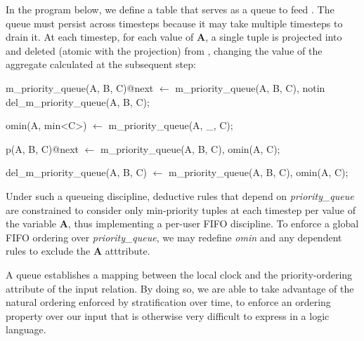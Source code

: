 In the program below, we define a table  that
serves as a queue to feed .  The queue must persist
across timesteps because it may take multiple timesteps to drain it.  At each
timestep, for each value of \textbf{A}, a single tuple is projected into
 and deleted (atomic with the projection) from
, changing the value of the aggregate calculated
at the subsequent step:

\begin{Dedalus}
m\_priority\_queue(A, B, C)@next \(\leftarrow\)
  m\_priority\_queue(A, B, C),
  notin del\_m\_priority\_queue(A, B, C);

omin(A, min<C>) \(\leftarrow\)
  m\_priority\_queue(A, _, C);

p(A, B, C)@next \(\leftarrow\)
  m\_priority\_queue(A, B, C),
  omin(A, C);

del\_m\_priority\_queue(A, B, C) \(\leftarrow\)
  m\_priority\_queue(A, B, C),
  omin(A, C);
\end{Dedalus}

Under such a queueing discipline, deductive rules that depend on
\emph{priority\_queue} are constrained to consider only min-priority tuples at each timestep
per value of the variable \textbf{A}, thus implementing a per-user FIFO
discipline.  To enforce a global FIFO ordering over \emph{priority\_queue}, we
may redefine \emph{omin} and any dependent rules to exclude the \textbf{A}
atttribute.

A queue establishes a mapping between the local clock and the priority-ordering attribute of the input relation. By doing so, we are able to take
advantage of the natural ordering enforced by stratification over time, to enforce an ordering property over our input that is otherwise 
very difficult to express in a logic language.





